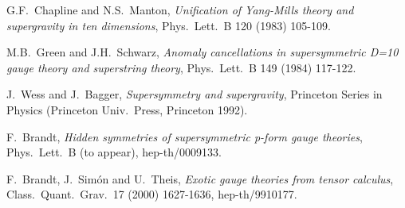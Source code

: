 \documentclass[a4paper,12pt]{article}
\begin{document}
\begin{thebibliography}{30}
G.F.\ Chapline and N.S.\ Manton,
{\it Unification of Yang-Mills theory and supergravity in ten dimensions},
Phys.\ Lett.\ B 120 (1983) 105-109.

M.B.\ Green and J.H.\ Schwarz,
{\it Anomaly cancellations in supersymmetric D=10 gauge theory 
and superstring theory},
Phys.\ Lett.\ B 149 (1984) 117-122.

J.\ Wess and J.\ Bagger, 
{\it Supersymmetry and supergravity},
Princeton Series in Physics (Princeton Univ.\ Press,
Princeton 1992).

F.\ Brandt,
{\it Hidden symmetries of supersymmetric p-form gauge theories},
Phys.\ Lett.\ B (to appear), 
hep-th/0009133.

F.\ Brandt, J.\ Sim\'on and U.\ Theis,
{\it Exotic gauge theories from tensor calculus},
Class.\ Quant.\ Grav.\ 17 (2000) 1627-1636,
hep-th/9910177.

\end{thebibliography}
\end{document}
